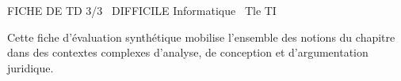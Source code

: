 \documentclass[11pt]{article}
\begin{document}
\thispagestyle{empty}

\begin{tcolorbox}[enhanced,colback=popink,colframe=popink,arc=10pt,boxrule=0pt,left=12pt,right=12pt,top=9pt,bottom=9pt]
{\color{white}\popxbold\small FICHE DE TD 3/3 \textbullet\ DIFFICILE \hfill Informatique \textbullet\ Tle TI\par}
\end{tcolorbox}
\vspace{4pt}

Cette fiche d'évaluation synthétique mobilise l'ensemble des notions du chapitre dans des contextes complexes d'analyse, de conception et d'argumentation juridique.
\end{document}
